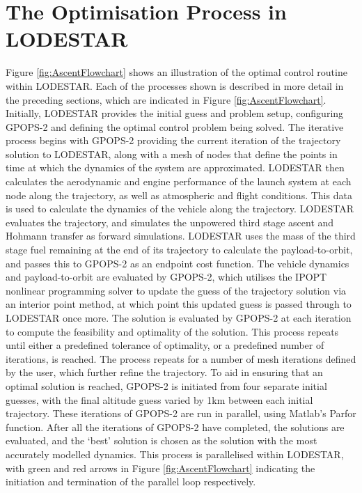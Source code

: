 \section{The Optimisation Process in LODESTAR}
Figure \ref{fig:AscentFlowchart} shows an illustration of the optimal control routine within LODESTAR. Each of the processes shown is described in more detail in the preceding sections, which are indicated in Figure \ref{fig:AscentFlowchart}. Initially, LODESTAR provides the initial guess and problem setup, configuring GPOPS-2 and defining the optimal control problem being solved. 
The iterative process begins with GPOPS-2 providing the current iteration of the trajectory solution to LODESTAR, along with a mesh of nodes that define the points in time at which the dynamics of the system are approximated.
LODESTAR then calculates the aerodynamic and engine performance of the launch system at each node along the trajectory, as well as atmospheric and flight conditions. This data is used to calculate the dynamics of the vehicle along the trajectory. LODESTAR evaluates the trajectory, and simulates the unpowered third stage ascent and Hohmann transfer as forward simulations. LODESTAR uses the mass of the third stage fuel remaining at the end of its trajectory to calculate the payload-to-orbit, and passes this to GPOPS-2 as an endpoint cost function. 
The vehicle dynamics and payload-to-orbit are evaluated by GPOPS-2, which utilises the IPOPT nonlinear programming solver\cite{Wachter2006} to update the guess of the trajectory solution via an interior point method, at which point this updated guess is passed through to LODESTAR once more. The solution is evaluated by GPOPS-2 at each iteration to compute the feasibility and optimality of the solution. This process repeats until either a predefined tolerance of optimality, or a predefined number of iterations, is reached. The process repeats for a number of mesh iterations defined by the user, which further refine the trajectory. 
To aid in ensuring that an optimal solution is reached, GPOPS-2 is initiated from four separate initial guesses, with the final altitude guess varied by 1km between each initial trajectory. These iterations of GPOPS-2 are run in parallel, using Matlab's \textsf{Parfor} function. After all the iterations of GPOPS-2 have completed, the solutions are evaluated, and the `best' solution is chosen as the solution with the most accurately modelled dynamics. This process is parallelised within LODESTAR, with green and red arrows in Figure \ref{fig:AscentFlowchart} indicating the initiation and termination of the parallel loop respectively. 




